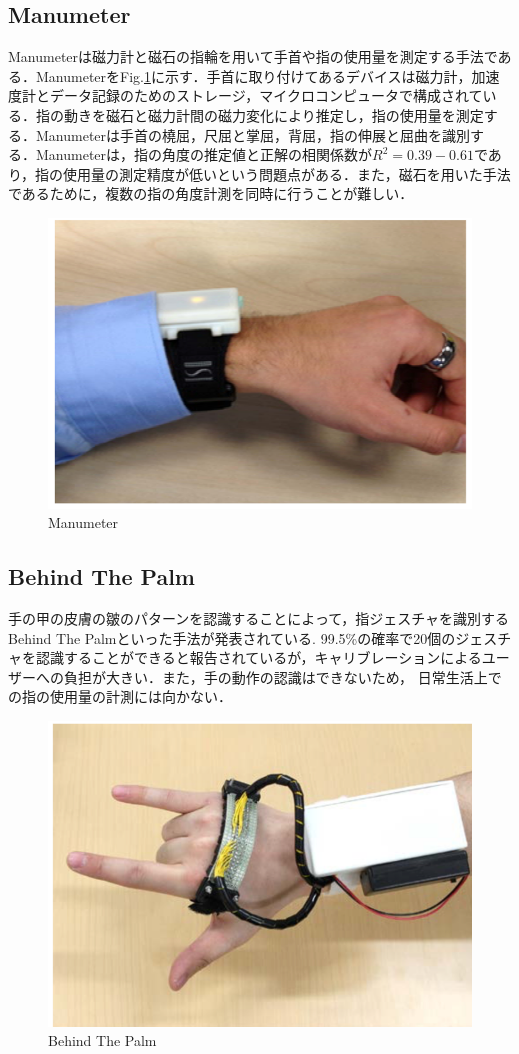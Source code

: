 \subsection*{Manumeter}
Manumeter\cite{Friedman2014}は磁力計と磁石の指輪を用いて手首や指の使用量を測定する手法である．ManumeterをFig.\ref{fig:Manumeter}に示す．手首に取り付けてあるデバイスは磁力計，加速度計とデータ記録のためのストレージ，マイクロコンピュータで構成されている．指の動きを磁石と磁力計間の磁力変化により推定し，指の使用量を測定する．Manumeterは手首の橈屈，尺屈と掌屈，背屈，指の伸展と屈曲を識別する．Manumeterは，指の角度の推定値と正解の相関係数が$R^2=0.39-0.61$であり，指の使用量の測定精度が低いという問題点がある．また，磁石を用いた手法であるために，複数の指の角度計測を同時に行うことが難しい．
\begin{figure}[H]
  \centering
  \includegraphics[width=0.6\linewidth]{fig/ch1/manumeter}
  \caption{Manumeter\cite{Friedman2014}}
  \label{fig:Manumeter}
\end{figure}

\subsection*{Behind The Palm}
手の甲の皮膚の皺のパターンを認識することによって，指ジェスチャを識別するBehind The Palm\cite{Recognition2017}といった手法が発表されている.
99.5\%の確率で20個のジェスチャを認識することができると報告されているが，キャリブレーションによるユーザーへの負担が大きい．また，手の動作の認識はできないため，
日常生活上での指の使用量の計測には向かない．
\begin{figure}[H]
  \centering
  \includegraphics[width=0.6\linewidth]{fig/ch1/btp}
  \caption{Behind The Palm\cite{Recognition2017}}
  \label{fig:Behind The Palm}
\end{figure}

